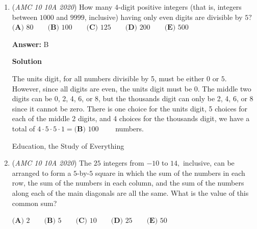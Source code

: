 \begin{enumerate}
\begin{enumerate}
  In this case, the only solution is $x=6.$

            \end{enumerate}
            Finally, the sum of all solutions is $12+6=\boxed{\textbf{(C) } 18}.$




\textbf{Solution 4 (Time Saving)}

We have $x^2 - 12x + 34 = 2$ or $x^2 - 12x + 34 = -2$. Solving the latter yields $x=6$. Now, from here, we know that the first equation either has 2 solutions or no solution since it isn't a perfect square. By Vieta's, this would imply the sum to be either 0 or 12, making the whole sum 6 or 18. Since 6 isn't an answer choice, the answer must be 18.

 Education, The Study Of Everything

 


	\item (\textit{AMC 10 10A 2020}) How many $4$-digit positive integers (that is, integers between $1000$ and $9999$, inclusive) having only even digits are divisible by $5?$
$\textbf{(A) } 80 \qquad \textbf{(B) } 100 \qquad \textbf{(C) } 125 \qquad \textbf{(D) } 200 \qquad \textbf{(E) } 500$

 \textbf{Answer: }B



\textbf{Solution}

The units digit, for all numbers divisible by 5, must be either $0$ or $5$. However, since all digits are even, the units digit must be $0$. The middle two digits can be 0, 2, 4, 6, or 8, but the thousands digit can only be 2, 4, 6, or 8 since it cannot be zero. There is one choice for the units digit, 5 choices for each of the middle 2 digits, and 4 choices for the thousands digit, we have a total of $4\cdot5\cdot5\cdot1 = \boxed{\textbf{(B) } 100} \qquad$ numbers.

 Education, the Study of Everything

 


	\item (\textit{AMC 10 10A 2020}) The $25$ integers from $-10$ to $14,$ inclusive, can be arranged to form a $5$-by-$5$ square in which the sum of the numbers in each row, the sum of the numbers in each column, and the sum of the numbers along each of the main diagonals are all the same. What is the value of this common sum?


 $\textbf{(A) }2 \qquad\textbf{(B) } 5\qquad\textbf{(C) } 10\qquad\textbf{(D) } 25\qquad\textbf{(E) } 50$


\end{enumerate}
